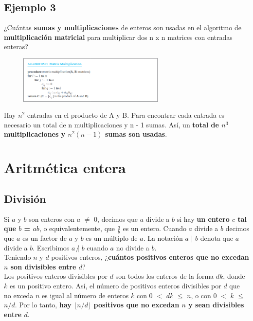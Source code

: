 \documentclass{article}
\begin{document}
\subsection{Ejemplo 3}
¿Cuántas \textbf{sumas y multiplicaciones} de enteros son usadas en el algoritmo de \textbf{multiplicación matricial} para multiplicar dos n x n matrices con entradas enteras?

\begin{figure}[h]
    \centering
    \includegraphics[width=0.65\textwidth]{img-t1/img_031_03.png}
\end{figure}

Hay $n^2$ entradas en el producto de A y B. Para encontrar cada entrada es necesario un total de n multiplicaciones y n - 1 sumas. Así, un \textbf{total de $n^3$ multiplicaciones y $n^2(n-1)$ sumas son usadas}.

\newpage

\section{Aritmética entera}

\subsection{División}
Si $a$ y $b$ son enteros con $a$ $\neq$ 0, decimos que $a$ divide a $b$ si hay \textbf{un entero $c$ tal que $b$ = $ab$}, o equivalentemente, que $\frac{a}{b}$ es un entero. Cuando $a$ divide a $b$ decimos que $a$ es un factor de $a$ y $b$ es un múltiplo de $a$. La notación $a$ $|$ $b$ denota que $a$ divide a $b$. Escribimos $a$ $\not|$ $b$ cuando $a$ no divide a $b$. \\

Teniendo $n$ y $d$ positivos enteros, ¿\textbf{cuántos positivos enteros que no excedan $n$ son divisibles entre $d$}?\\
Los positivos enteros divisibles por $d$ son todos los enteros de la forma $dk$, donde $k$ es un positivo entero. Así, el número de positivos enteros divisibles por $d$ que no exceda $n$ es igual al número de enteros $k$ con 0 $<$ $dk$ $\leq$ $n$, o con 0 $<$ $k$ $\leq$ $n/d$. Por lo tanto, \textbf{hay $\lfloor n/d \rfloor$ positivos que no excedan $n$ y sean divisibles entre $d$}. \\
\end{document}
